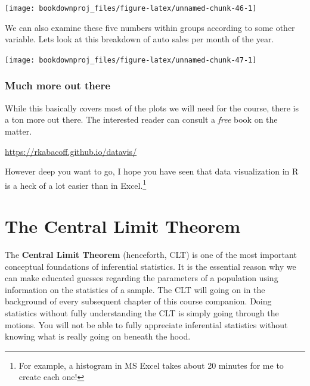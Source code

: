 \documentclass[
]{book}
\newenvironment{Shaded}{\begin{snugshade}}{\end{snugshade}}
\newcommand{\FunctionTok}[1]{\textcolor[rgb]{0.00,0.00,0.00}{#1}}
\newcommand{\NormalTok}[1]{#1}
\newcommand{\SpecialCharTok}[1]{\textcolor[rgb]{0.00,0.00,0.00}{#1}}
\begin{document}
\begin{center}\texttt{[image: bookdownproj\_files/figure-latex/unnamed-chunk-46-1]} \end{center}

We can also examine these five numbers within groups according to some other variable. Lets look at this breakdown of auto sales per month of the year.

\begin{Shaded}
\end{Shaded}

\begin{center}\texttt{[image: bookdownproj\_files/figure-latex/unnamed-chunk-47-1]} \end{center}

\hypertarget{much-more-out-there}{%
\subsection{Much more out there}\label{much-more-out-there}}

While this basically covers most of the plots we will need for the course, there is a ton more out there. The interested reader can consult a \emph{free} book on the matter.

\url{https://rkabacoff.github.io/datavis/}

However deep you want to go, I hope you have seen that data visualization in R is a heck of a lot easier than in Excel.\footnote{For example, a histogram in MS Excel takes about 20 minutes for me to create each one!}

\hypertarget{CLT}{%
\chapter{The Central Limit Theorem}\label{CLT}}

The \textbf{Central Limit Theorem} (henceforth, CLT) is one of the most important conceptual foundations of inferential statistics. It is the essential reason why we can make educated guesses regarding the parameters of a population using information on the statistics of a sample. The CLT will going on in the background of every subsequent chapter of this course companion. Doing statistics without fully understanding the CLT is simply going through the motions. You will not be able to fully appreciate inferential statistics without knowing what is really going on beneath the hood.
\end{document}

